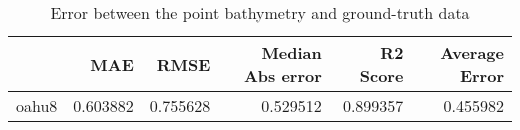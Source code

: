 \begin{table}[h!]
\caption{Error between the point bathymetry and ground-truth data}
\label{tab:oahu8_lidar_error}
\begin{tabular}{lrrrrr}
\toprule
 & MAE & RMSE & Median Abs error & R2 Score & Average Error \\
\midrule
oahu8 & 0.603882 & 0.755628 & 0.529512 & 0.899357 & 0.455982 \\
\bottomrule
\end{tabular}
\end{table}
